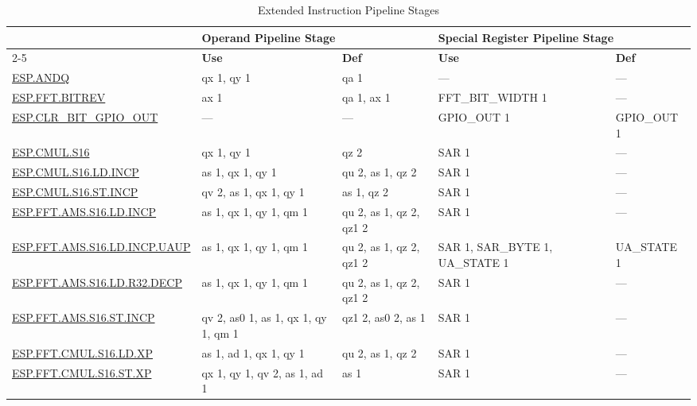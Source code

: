 
\begin{longtable}[c]{|l|m{2.5cm}|m{2.5cm}|m{2.5cm}|m{2.5cm}|}
    \caption{Extended Instruction Pipeline Stages}
    \label{tab:pie_inst_pipelining}\\
    \hline
    \rowcolor{lightgray}
     & \multicolumn{2}{l|}{\textbf{Operand Pipeline Stage}} & \multicolumn{2}{l|}{\textbf{Special Register Pipeline Stage}} \\\cline{2-5}
    \rowcolor{lightgray}
    \multirow{-2}{1in}{\textbf{Instruction}} & \textbf{Use} & \textbf{Def} & \textbf{Use} & \textbf{Def} \\\hline
    \hyperref[instruction:ESPANDQ]{ESP.ANDQ} & qx 1, qy 1 & qa 1 & — & — \\\hline
    \hyperref[instruction:ESPFFTBITREV]{ESP.FFT.BITREV} & ax 1 & qa 1, ax 1 & FFT\_BIT\_WIDTH 1 & — \\\hline
    \hyperref[instruction:ESPCLRBITGPIOOUT]{ESP.CLR\_BIT\_GPIO\_OUT} & — & — & GPIO\_OUT 1 & GPIO\_OUT 1 \\\hline
    \hyperref[instruction:ESPCMULS16]{ESP.CMUL.S16} & qx 1, qy 1 & qz 2 & SAR 1 & — \\\hline
    \hyperref[instruction:ESPCMULS16LDINCP]{ESP.CMUL.S16.LD.INCP} & as 1, qx 1, qy 1 & qu 2, as 1, qz 2 & SAR 1 & — \\\hline
    \hyperref[instruction:ESPCMULS16STINCP]{ESP.CMUL.S16.ST.INCP} & qv 2, as 1, qx 1, qy 1 & as 1, qz 2 & SAR 1 & — \\\hline
    \hyperref[instruction:ESPFFTAMSS16LDINCP]{ESP.FFT.AMS.S16.LD.INCP} & as 1, qx 1, qy 1, qm 1 & qu 2, as 1, qz 2, qz1 2 & SAR 1 & — \\\hline
    \hyperref[instruction:ESPFFTAMSS16LDINCPUAUP]{ESP.FFT.AMS.S16.LD.INCP.UAUP} & as 1, qx 1, qy 1, qm 1 & qu 2, as 1, qz 2, qz1 2 & SAR 1, SAR\_BYTE 1, UA\_STATE 1 & UA\_STATE 1\\\hline
    \hyperref[instruction:ESPFFTAMSS16LDR32DECP]{ESP.FFT.AMS.S16.LD.R32.DECP} & as 1, qx 1, qy 1, qm 1 & qu 2, as 1, qz 2, qz1 2 & SAR 1 & — \\\hline
    \hyperref[instruction:ESPFFTAMSS16STINCP]{ESP.FFT.AMS.S16.ST.INCP} & qv 2, as0 1, as 1, qx 1, qy 1, qm 1 & qz1 2, as0 2, as 1 & SAR 1 & — \\\hline
    \hyperref[instruction:ESPFFTCMULS16LDXP]{ESP.FFT.CMUL.S16.LD.XP} & as 1, ad 1, qx 1, qy 1 & qu 2, as 1, qz 2 & SAR 1 & — \\\hline
    \hyperref[instruction:ESPFFTCMULS16STXP]{ESP.FFT.CMUL.S16.ST.XP} & qx 1, qy 1, qv 2, as 1, ad 1 & as 1 & SAR 1 & — \\\hline

\end{longtable}
